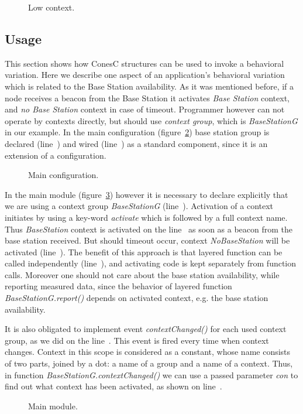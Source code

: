 
\begin{figure}[!h]
\TheSbox
\caption{Low context.}
\label{fig:lc}
\end{figure}

\subsection{Usage}

This section shows how ConesC structures can be used to invoke a behavioral
variation. Here we describe one aspect of an application's behavioral variation
which is related to the Base Station availability. As it was mentioned before,
if a node receives a beacon from the Base Station it activates \emph{Base
Station} context, and \emph{no Base Station} context in case of timeout.
Programmer however can not operate by contexts directly, but should use
\emph{context group}, which is \emph{BaseStationG} in our example. In the main
configuration (figure~\ref{fig:mc}) base station group is declared
(line~) and wired (line~) as a standard
component, since it is an extension of a configuration.


\begin{figure}[!h]
\TheSbox
\caption{Main configuration.}
\label{fig:mc}
\end{figure}

In the main module (figure~\ref{fig:mm}) however it is necessary to declare
explicitly that we are using a context group \emph{BaseStationG}
(line~). Activation of a context initiates by using a key-word
\emph{activate} which is followed by a full context name. Thus
\emph{BaseStation} context is activated on the line~ as soon as a
beacon from the base station received. But should timeout occur, context
\emph{NoBaseStation} will be activated (line~). The benefit of
this approach is that layered function can be called independently
(line~), and activating code is kept separately from function
calls. Moreover one should not care about the base station availability, while
reporting measured data, since the behavior of layered function
\emph{BaseStationG.report()} depends on activated context, e.g. the base station
availability.

It is also obligated to implement event \emph{contextChanged()} for each used
context group, as we did on the line~. This event is fired every
time when context changes. Context in this scope is considered as a constant,
whose name consists of two parts, joined by a dot: a name of a group and a name
of a context. Thus, in function \emph{BaseStationG.contextChanged()} we can use
a passed parameter \emph{con} to find out what context has been activated, as
shown on line~.


\begin{figure}[!h]
\TheSbox
\caption{Main module.}
\label{fig:mm}
\end{figure}
